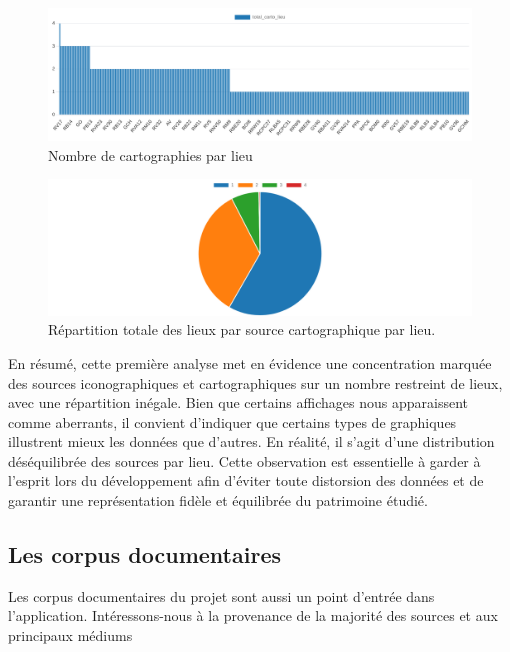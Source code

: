 \begin{figure}[ht!]
    \centering
    \includegraphics[width=1\linewidth]{images/graphiques/nb_carto_lieu_barChart.png}
    \caption{Nombre de cartographies par lieu}
    \label{fig:répartition_totale_carto_lieu}
\end{figure}

\begin{figure}[ht!]
    \centering
    \includegraphics[width=0.8\linewidth]{images/graphiques/repartition_lieux_nb_carto_lieu_pie.png}
    \caption{Répartition totale des lieux par source cartographique par lieu.}
    \label{fig:repartition_carto_lieu}
\end{figure}

En résumé, cette première analyse met en évidence une concentration marquée des sources iconographiques et cartographiques sur un nombre restreint de lieux, avec une répartition inégale. Bien que certains affichages nous apparaissent comme aberrants, il convient d'indiquer que certains types de graphiques illustrent mieux les données que d'autres. En réalité, il s'agit d'une distribution déséquilibrée des sources par lieu.  Cette observation est essentielle à garder à l'esprit lors du développement afin d'éviter toute distorsion des données et de garantir une représentation fidèle et équilibrée du patrimoine étudié.

\subsection{Les corpus documentaires}
Les corpus documentaires du projet sont aussi un point d'entrée dans l'application. Intéressons-nous à la provenance de la majorité des sources et aux principaux médiums 

